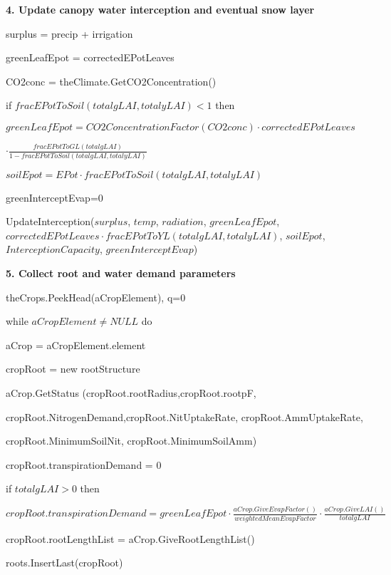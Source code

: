 \documentclass[%
]{scrartcl}
\begin{document}
    \textbf{4. Update canopy water interception and eventual snow layer}

     surplus = precip + irrigation
   
  greenLeafEpot = correctedEPotLeaves
   
  CO2conc = theClimate.GetCO2Concentration()
  
 if $fracEPotToSoil(totalgLAI,totalyLAI)<1$ then
    
    \quad $	 greenLeafEpot =
 CO2ConcentrationFactor(CO2conc) \cdot correctedEPotLeaves$

\quad\quad $ \cdot \tfrac{fracEPotToGL(totalgLAI)}{1-fracEPotToSoil(totalgLAI,totalyLAI)}$
   
   \quad	 $soilEpot = EPot \cdot 
fracEPotToSoil(totalgLAI,totalyLAI)$
   
   \quad	 greenInterceptEvap=0
 
  UpdateInterception($surplus$,
                		 $temp$,
			 	          $radiation$,
                      $greenLeafEpot$,
			 			   $ correctedEPotLeaves \cdot fracEPotToYL(totalgLAI,totalyLAI)$,
			 			    $soilEpot$,
                      $InterceptionCapacity$,
                     $ greenInterceptEvap$)

    \textbf{5. Collect root and water demand parameters}

   theCrops.PeekHead(aCropElement),    
 q=0
 
  while $aCropElement\ne NULL$ do
        
  \quad aCrop = aCropElement.element
    
   \quad cropRoot = new rootStructure
    	
 \quad aCrop.GetStatus (cropRoot.rootRadius,cropRoot.rootpF, 

 \quad  \quad cropRoot.NitrogenDemand,cropRoot.NitUptakeRate, cropRoot.AmmUptakeRate, 

 \quad  \quad cropRoot.MinimumSoilNit, cropRoot.MinimumSoilAmm)
    
   \quad cropRoot.transpirationDemand = 0
    
   \quad  if $totalgLAI>0$ then
       
 \quad     \quad  $cropRoot.transpirationDemand = 
greenLeafEpot \cdot \tfrac{aCrop.GiveEvapFactor()}{weightedMeanEvapFactor}
\cdot \tfrac{aCrop.GiveLAI()}{totalgLAI}$
     
  \quad  cropRoot.rootLengthList = aCrop.GiveRootLengthList()
     
  \quad  roots.InsertLast(cropRoot)
     
\end{document}
